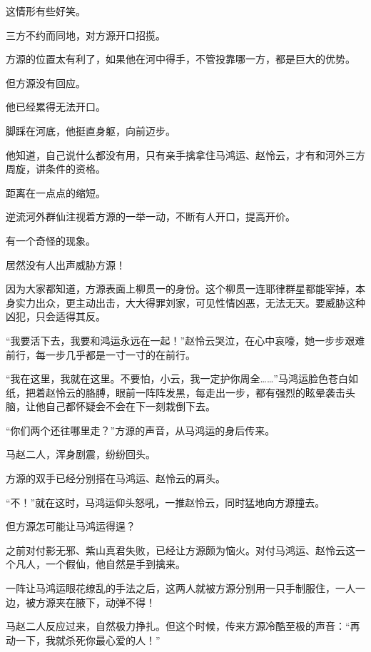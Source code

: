 
\begin{this_body}



这情形有些好笑。

三方不约而同地，对方源开口招揽。

方源的位置太有利了，如果他在河中得手，不管投靠哪一方，都是巨大的优势。

但方源没有回应。

他已经累得无法开口。

脚踩在河底，他挺直身躯，向前迈步。

他知道，自己说什么都没有用，只有亲手擒拿住马鸿运、赵怜云，才有和河外三方周旋，讲条件的资格。

距离在一点点的缩短。

逆流河外群仙注视着方源的一举一动，不断有人开口，提高开价。

有一个奇怪的现象。

居然没有人出声威胁方源！

因为大家都知道，方源表面上柳贯一的身份。这个柳贯一连耶律群星都能宰掉，本身实力出众，更主动出击，大大得罪刘家，可见性情凶恶，无法无天。要威胁这种凶犯，只会适得其反。

“我要活下去，我要和鸿运永远在一起！”赵怜云哭泣，在心中哀嚎，她一步步艰难前行，每一步几乎都是一寸一寸的在前行。

“我在这里，我就在这里。不要怕，小云，我一定护你周全……”马鸿运脸色苍白如纸，把着赵怜云的胳膊，眼前一阵阵发黑，每走出一步，都有强烈的眩晕袭击头脑，让他自己都怀疑会不会在下一刻栽倒下去。

“你们两个还往哪里走？”方源的声音，从马鸿运的身后传来。

马赵二人，浑身剧震，纷纷回头。

方源的双手已经分别搭在马鸿运、赵怜云的肩头。

“不！”就在这时，马鸿运仰头怒吼，一推赵怜云，同时猛地向方源撞去。

但方源怎可能让马鸿运得逞？

之前对付影无邪、紫山真君失败，已经让方源颇为恼火。对付马鸿运、赵怜云这一个凡人，一个假仙，他自然是手到擒来。

一阵让马鸿运眼花缭乱的手法之后，这两人就被方源分别用一只手制服住，一人一边，被方源夹在腋下，动弹不得！

马赵二人反应过来，自然极力挣扎。但这个时候，传来方源冷酷至极的声音：“再动一下，我就杀死你最心爱的人！”


\end{this_body}
